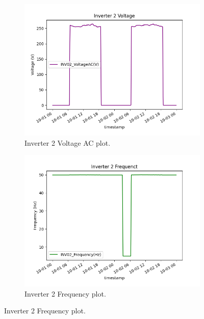 \begin{figure}[H]
	\begin{subfigure}[t]{0.45\textwidth}
		\centering
		\includegraphics[width=\textwidth, keepaspectratio]{chapters/1_introduction/imgs/inv2voltage.png}
		\caption{Inverter 2 Voltage AC plot.}
		\label{fig:inv02volt}
	\end{subfigure}
	\hspace{0.5cm}
	\begin{subfigure}[t]{0.45\textwidth}
		\centering
		\includegraphics[width=\textwidth, keepaspectratio]{chapters/1_introduction/imgs/inv2freq.png}
		\caption{Inverter 2 Frequency plot.}
		\label{fig:inv02freq}
	\end{subfigure}
\end{figure}


